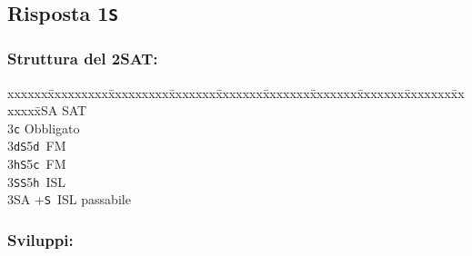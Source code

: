 \documentclass[a4paper,italian]{article}
\newcommand{\BS}{\small{\texttt{S}}}
\newcommand{\BC}{\small{\texttt{c}}}
\newcommand{\BD}{\small{\texttt{d}}}
\newcommand{\BH}{\small{\texttt{h}}}
\newcommand{\pdfs}{\texorpdfstring{\texttt{S}}{S}}
\newenvironment{bidtable}
{\begin{tabbing}

    xxxxxx\=xxxxxxxxx\=xxxxxxxxx\=xxxxxxx\=xxxxxxx\=xxxxxxx\=xxxxxxx\=xxxxxxx\=xxxxxxx\=xxxxxxx\=\kill}
{\end{tabbing} }%
\begin{document}
\begin{multicols}{2}
    \subsection{Risposta 1\pdfs}

    \subsubsection{Struttura del 2SAT:}

    \begin{bidtable}
        2\small{SA} \small{SA}T\+\\
        3\BC \> Obbligato\+\\
        3\BD {}\BS 5\BD\ FM\\
        3\BH {}\BS 5\BC\ FM\\
        3\BS {}\BS 5\BH\ ISL\\
        3\small{SA} +\BS\ ISL passabile\-\-
    \end{bidtable}

    \subsubsection{Sviluppi:}


\end{multicols}
\end{document}
